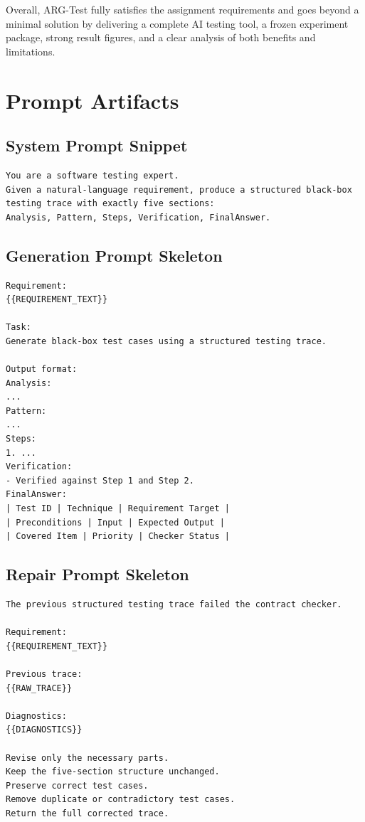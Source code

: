 \documentclass{article}
\begin{document}
Overall, ARG-Test fully satisfies the assignment requirements and goes beyond a minimal solution by delivering a complete AI testing tool, a frozen experiment package, strong result figures, and a clear analysis of both benefits and limitations.

\clearpage
\onecolumn
\appendix
\section{Prompt Artifacts}
\subsection{System Prompt Snippet}
\begin{verbatim}
You are a software testing expert.
Given a natural-language requirement, produce a structured black-box
testing trace with exactly five sections:
Analysis, Pattern, Steps, Verification, FinalAnswer.
\end{verbatim}

\subsection{Generation Prompt Skeleton}
\begin{verbatim}
Requirement:
{{REQUIREMENT_TEXT}}

Task:
Generate black-box test cases using a structured testing trace.

Output format:
Analysis:
...
Pattern:
...
Steps:
1. ...
Verification:
- Verified against Step 1 and Step 2.
FinalAnswer:
| Test ID | Technique | Requirement Target |
| Preconditions | Input | Expected Output |
| Covered Item | Priority | Checker Status |
\end{verbatim}

\subsection{Repair Prompt Skeleton}
\begin{verbatim}
The previous structured testing trace failed the contract checker.

Requirement:
{{REQUIREMENT_TEXT}}

Previous trace:
{{RAW_TRACE}}

Diagnostics:
{{DIAGNOSTICS}}

Revise only the necessary parts.
Keep the five-section structure unchanged.
Preserve correct test cases.
Remove duplicate or contradictory test cases.
Return the full corrected trace.
\end{verbatim}
\end{document}
